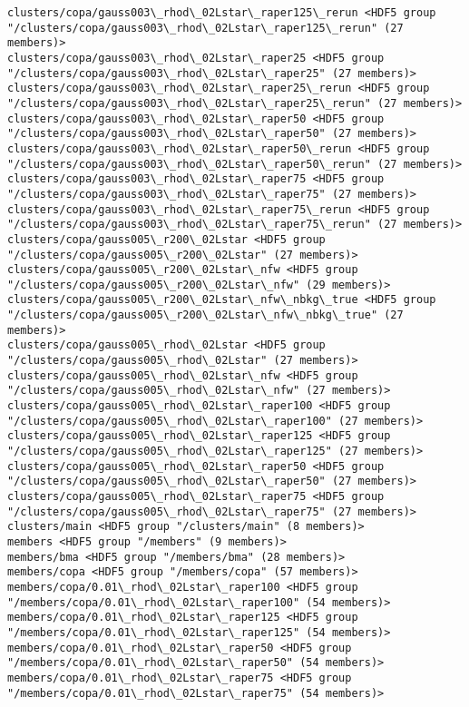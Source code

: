 \documentclass[11pt]{article}
\begin{document}
\begin{Verbatim}[commandchars=\\\{\}]
clusters/copa/gauss003\_rhod\_02Lstar\_raper125\_rerun <HDF5 group "/clusters/copa/gauss003\_rhod\_02Lstar\_raper125\_rerun" (27 members)>
clusters/copa/gauss003\_rhod\_02Lstar\_raper25 <HDF5 group "/clusters/copa/gauss003\_rhod\_02Lstar\_raper25" (27 members)>
clusters/copa/gauss003\_rhod\_02Lstar\_raper25\_rerun <HDF5 group "/clusters/copa/gauss003\_rhod\_02Lstar\_raper25\_rerun" (27 members)>
clusters/copa/gauss003\_rhod\_02Lstar\_raper50 <HDF5 group "/clusters/copa/gauss003\_rhod\_02Lstar\_raper50" (27 members)>
clusters/copa/gauss003\_rhod\_02Lstar\_raper50\_rerun <HDF5 group "/clusters/copa/gauss003\_rhod\_02Lstar\_raper50\_rerun" (27 members)>
clusters/copa/gauss003\_rhod\_02Lstar\_raper75 <HDF5 group "/clusters/copa/gauss003\_rhod\_02Lstar\_raper75" (27 members)>
clusters/copa/gauss003\_rhod\_02Lstar\_raper75\_rerun <HDF5 group "/clusters/copa/gauss003\_rhod\_02Lstar\_raper75\_rerun" (27 members)>
clusters/copa/gauss005\_r200\_02Lstar <HDF5 group "/clusters/copa/gauss005\_r200\_02Lstar" (27 members)>
clusters/copa/gauss005\_r200\_02Lstar\_nfw <HDF5 group "/clusters/copa/gauss005\_r200\_02Lstar\_nfw" (29 members)>
clusters/copa/gauss005\_r200\_02Lstar\_nfw\_nbkg\_true <HDF5 group "/clusters/copa/gauss005\_r200\_02Lstar\_nfw\_nbkg\_true" (27 members)>
clusters/copa/gauss005\_rhod\_02Lstar <HDF5 group "/clusters/copa/gauss005\_rhod\_02Lstar" (27 members)>
clusters/copa/gauss005\_rhod\_02Lstar\_nfw <HDF5 group "/clusters/copa/gauss005\_rhod\_02Lstar\_nfw" (27 members)>
clusters/copa/gauss005\_rhod\_02Lstar\_raper100 <HDF5 group "/clusters/copa/gauss005\_rhod\_02Lstar\_raper100" (27 members)>
clusters/copa/gauss005\_rhod\_02Lstar\_raper125 <HDF5 group "/clusters/copa/gauss005\_rhod\_02Lstar\_raper125" (27 members)>
clusters/copa/gauss005\_rhod\_02Lstar\_raper50 <HDF5 group "/clusters/copa/gauss005\_rhod\_02Lstar\_raper50" (27 members)>
clusters/copa/gauss005\_rhod\_02Lstar\_raper75 <HDF5 group "/clusters/copa/gauss005\_rhod\_02Lstar\_raper75" (27 members)>
clusters/main <HDF5 group "/clusters/main" (8 members)>
members <HDF5 group "/members" (9 members)>
members/bma <HDF5 group "/members/bma" (28 members)>
members/copa <HDF5 group "/members/copa" (57 members)>
members/copa/0.01\_rhod\_02Lstar\_raper100 <HDF5 group "/members/copa/0.01\_rhod\_02Lstar\_raper100" (54 members)>
members/copa/0.01\_rhod\_02Lstar\_raper125 <HDF5 group "/members/copa/0.01\_rhod\_02Lstar\_raper125" (54 members)>
members/copa/0.01\_rhod\_02Lstar\_raper50 <HDF5 group "/members/copa/0.01\_rhod\_02Lstar\_raper50" (54 members)>
members/copa/0.01\_rhod\_02Lstar\_raper75 <HDF5 group "/members/copa/0.01\_rhod\_02Lstar\_raper75" (54 members)>

\end{Verbatim}
\end{document}
